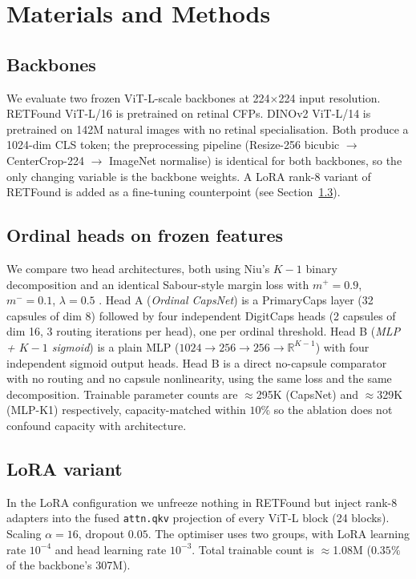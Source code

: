 \documentclass[journal]{IEEEtran}
\begin{document}
\section{Materials and Methods}
\label{sec:method}

\subsection{Backbones}
We evaluate two frozen ViT-L-scale backbones at 224$\times$224 input resolution. RETFound ViT-L/16 \cite{ref:retfound} is pretrained on retinal CFPs. DINOv2 ViT-L/14 \cite{ref:dinov2} is pretrained on 142M natural images with no retinal specialisation. Both produce a 1024-dim CLS token; the preprocessing pipeline (Resize-256 bicubic $\to$ CenterCrop-224 $\to$ ImageNet normalise) is identical for both backbones, so the only changing variable is the backbone weights. A LoRA rank-8 variant of RETFound \cite{ref:lora} is added as a fine-tuning counterpoint (see Section~\ref{sec:lora}).

\subsection{Ordinal heads on frozen features}
We compare two head architectures, both using Niu's $K{-}1$ binary decomposition and an identical Sabour-style margin loss with $m^+ = 0.9$, $m^- = 0.1$, $\lambda = 0.5$ \cite{ref:sabour}. Head A (\textit{Ordinal CapsNet}) is a PrimaryCaps layer (32 capsules of dim 8) followed by four independent DigitCaps heads (2 capsules of dim 16, 3 routing iterations per head), one per ordinal threshold. Head B (\textit{MLP + $K{-}1$ sigmoid}) is a plain MLP ($1024 \to 256 \to 256 \to \mathbb{R}^{K-1}$) with four independent sigmoid output heads. Head B is a direct no-capsule comparator with no routing and no capsule nonlinearity, using the same loss and the same decomposition. Trainable parameter counts are $\approx$295K (CapsNet) and $\approx$329K (MLP-K1) respectively, capacity-matched within $10\%$ so the ablation does not confound capacity with architecture.

\subsection{LoRA variant}
\label{sec:lora}
In the LoRA configuration we unfreeze nothing in RETFound but inject rank-8 adapters into the fused \texttt{attn.qkv} projection of every ViT-L block (24 blocks). Scaling $\alpha = 16$, dropout $0.05$. The optimiser uses two groups, with LoRA learning rate $10^{-4}$ and head learning rate $10^{-3}$. Total trainable count is $\approx$1.08M ($0.35\%$ of the backbone's 307M).
\end{document}
